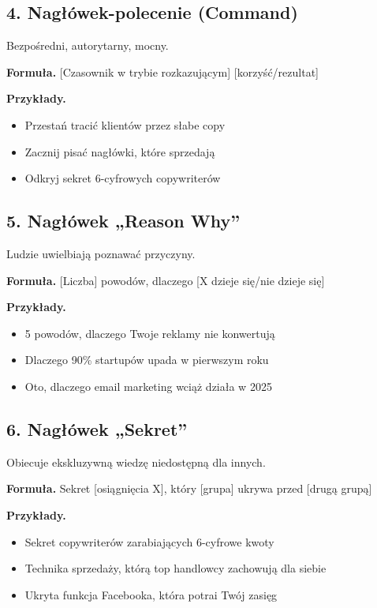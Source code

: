 \documentclass[
  12pt,
  a4paper,
  twoside,
  openright,
  12pt,
  DIV=12,
  BCOR=12mm]{scrbook}
\providecommand{\tightlist}{%
  \setlength{\itemsep}{0pt}\setlength{\parskip}{0pt}}\usepackage{longtable,booktabs,array}
\begin{document}
\subsection{4. Nagłówek-polecenie
(Command)}\label{nagux142uxf3wek-polecenie-command}

Bezpośredni, autorytarny, mocny.

\textbf{Formuła.} {[}Czasownik w trybie rozkazującym{]}
{[}korzyść/rezultat{]}

\textbf{Przykłady.}

\begin{itemize}
\tightlist
\item
  Przestań tracić klientów przez słabe copy
\item
  Zacznij pisać nagłówki, które sprzedają
\item
  Odkryj sekret 6-cyfrowych copywriterów
\end{itemize}

\subsection{5. Nagłówek „Reason Why''}\label{nagux142uxf3wek-reason-why}

Ludzie uwielbiają poznawać przyczyny.

\textbf{Formuła.} {[}Liczba{]} powodów, dlaczego {[}X dzieje się/nie
dzieje się{]}

\textbf{Przykłady.}

\begin{itemize}
\tightlist
\item
  5 powodów, dlaczego Twoje reklamy nie konwertują
\item
  Dlaczego 90\% startupów upada w pierwszym roku
\item
  Oto, dlaczego email marketing wciąż działa w 2025
\end{itemize}

\subsection{6. Nagłówek „Sekret''}\label{nagux142uxf3wek-sekret}

Obiecuje ekskluzywną wiedzę niedostępną dla innych.

\textbf{Formuła.} Sekret {[}osiągnięcia X{]}, który {[}grupa{]} ukrywa
przed {[}drugą grupą{]}

\textbf{Przykłady.}

\begin{itemize}
\tightlist
\item
  Sekret copywriterów zarabiających 6-cyfrowe kwoty
\item
  Technika sprzedaży, którą top handlowcy zachowują dla siebie
\item
  Ukryta funkcja Facebooka, która potrai Twój zasięg
\end{itemize}
\end{document}
